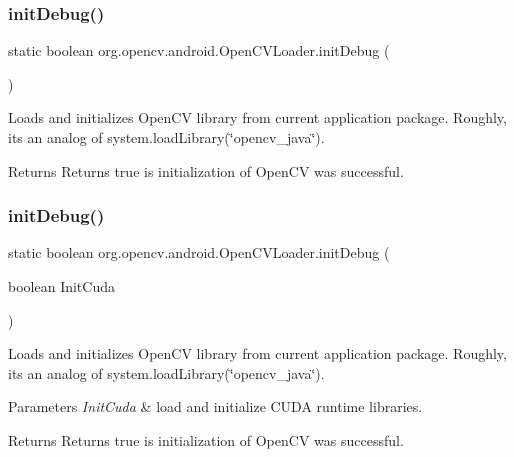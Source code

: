 \subsubsection{\texorpdfstring{init\+Debug()}{initDebug()}\hspace{0.1cm}{\footnotesize\ttfamily [1/2]}}
{\footnotesize\ttfamily static boolean org.\+opencv.\+android.\+Open\+C\+V\+Loader.\+init\+Debug (\begin{DoxyParamCaption}{ }\end{DoxyParamCaption})\hspace{0.3cm}{\ttfamily [static]}}

Loads and initializes Open\+CV library from current application package. Roughly, it\textquotesingle{}s an analog of system.\+load\+Library(\char`\"{}opencv\+\_\+java\char`\"{}). \begin{DoxyReturn}{Returns}
Returns true is initialization of Open\+CV was successful. 
\end{DoxyReturn}
\mbox{\label{classorg_1_1opencv_1_1android_1_1_open_c_v_loader_a1c075b7bd3e4d8d71de2ffc0f94d3371}} 
\subsubsection{\texorpdfstring{init\+Debug()}{initDebug()}\hspace{0.1cm}{\footnotesize\ttfamily [2/2]}}
{\footnotesize\ttfamily static boolean org.\+opencv.\+android.\+Open\+C\+V\+Loader.\+init\+Debug (\begin{DoxyParamCaption}\item[{boolean}]{Init\+Cuda }\end{DoxyParamCaption})\hspace{0.3cm}{\ttfamily [static]}}

Loads and initializes Open\+CV library from current application package. Roughly, it\textquotesingle{}s an analog of system.\+load\+Library(\char`\"{}opencv\+\_\+java\char`\"{}). 
\begin{DoxyParams}{Parameters}
{\em Init\+Cuda} & load and initialize C\+U\+DA runtime libraries. \\
\hline
\end{DoxyParams}
\begin{DoxyReturn}{Returns}
Returns true is initialization of Open\+CV was successful. 
\end{DoxyReturn}


